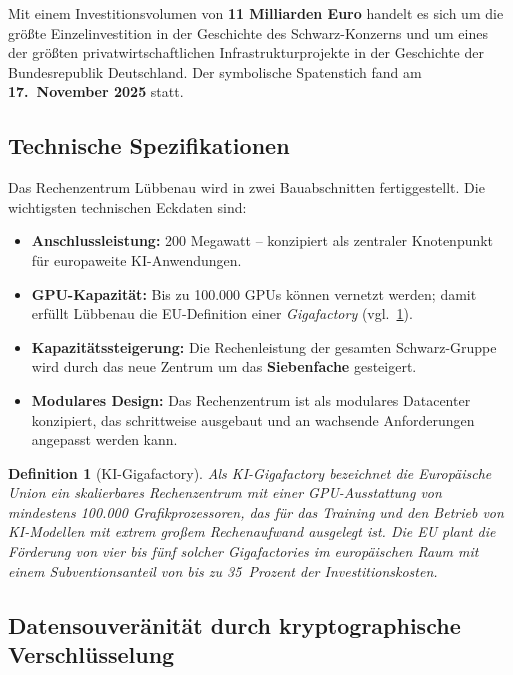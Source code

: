 ﻿\documentclass[12pt, a4paper, openany]{report}
\newtheorem{definition}[theorem]{Definition}
\begin{document}
Mit einem Investitionsvolumen von \textbf{11 Milliarden Euro} handelt es
sich um die größte Einzelinvestition in der Geschichte des Schwarz-Konzerns
und um eines der größten privatwirtschaftlichen Infrastrukturprojekte in der
Geschichte der Bundesrepublik Deutschland. Der symbolische Spatenstich fand
am \textbf{17.~November 2025} statt.

\subsection{Technische Spezifikationen}

Das Rechenzentrum Lübbenau wird in zwei Bauabschnitten fertiggestellt. Die
wichtigsten technischen Eckdaten sind:

\begin{itemize}[leftmargin=2em]
	\item \textbf{Anschlussleistung:} 200 Megawatt -- konzipiert als zentraler
	Knotenpunkt für europaweite KI-Anwendungen.
	\item \textbf{GPU-Kapazität:} Bis zu 100.000 GPUs können vernetzt werden;
	damit erfüllt Lübbenau die EU-Definition einer \emph{Gigafactory}
	(vgl.\ \cref{def:gigafactory}).
	\item \textbf{Kapazitätssteigerung:} Die Rechenleistung der gesamten
	Schwarz-Gruppe wird durch das neue Zentrum um das \textbf{Siebenfache}
	gesteigert.
	\item \textbf{Modulares Design:} Das Rechenzentrum ist als modulares Data\-center
	konzipiert, das schrittweise ausgebaut und an wachsende Anforderungen
	angepasst werden kann.
\end{itemize}

\begin{definition}[KI-Gigafactory]
	\label{def:gigafactory}
	Als \emph{KI-Gigafactory} bezeichnet die Europäische Union ein
	skalierbares Rechenzentrum mit einer GPU-Ausstattung von mindestens
	100.000 Grafikprozessoren, das für das Training und den Betrieb von
	KI-Modellen mit extrem großem Rechenaufwand ausgelegt ist. Die EU plant
	die Förderung von vier bis fünf solcher Gigafactories im europäischen Raum
	mit einem Subventionsanteil von bis zu 35~Prozent der Investitionskosten.
\end{definition}

\subsection{Datensouveränität durch kryptographische Verschlüsselung}
\end{document}
